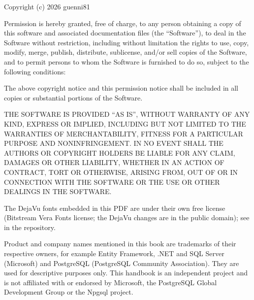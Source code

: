 Copyright (c) 2026 guenni81

Permission is hereby granted, free of charge, to any person obtaining a copy of this
software and associated documentation files (the “Software”), to deal in the Software
without restriction, including without limitation the rights to use, copy, modify, merge,
publish, distribute, sublicense, and/or sell copies of the Software, and to permit persons
to whom the Software is furnished to do so, subject to the following conditions:

The above copyright notice and this permission notice shall be included in all copies or
substantial portions of the Software.

THE SOFTWARE IS PROVIDED “AS IS”, WITHOUT WARRANTY OF ANY KIND, EXPRESS OR IMPLIED,
INCLUDING BUT NOT LIMITED TO THE WARRANTIES OF MERCHANTABILITY, FITNESS FOR A PARTICULAR
PURPOSE AND NONINFRINGEMENT. IN NO EVENT SHALL THE AUTHORS OR COPYRIGHT HOLDERS BE LIABLE
FOR ANY CLAIM, DAMAGES OR OTHER LIABILITY, WHETHER IN AN ACTION OF CONTRACT, TORT OR
OTHERWISE, ARISING FROM, OUT OF OR IN CONNECTION WITH THE SOFTWARE OR THE USE OR OTHER
DEALINGS IN THE SOFTWARE.

The DejaVu fonts embedded in this PDF are under their own free license (Bitstream Vera Fonts
license; the DejaVu changes are in the public domain); see
in the repository.

Product and company names mentioned in this book are trademarks of their respective owners,
for example Entity Framework, .NET and SQL Server (Microsoft) and PostgreSQL (PostgreSQL
Community Association). They are used for descriptive purposes only. This handbook is an
independent project and is not affiliated with or endorsed by Microsoft, the PostgreSQL
Global Development Group or the Npgsql project.
